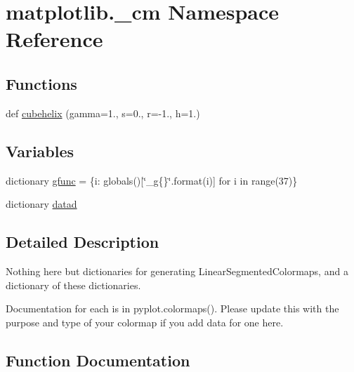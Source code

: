 \hypertarget{namespacematplotlib_1_1__cm}{}\section{matplotlib.\+\_\+cm Namespace Reference}
\label{namespacematplotlib_1_1__cm}
\subsection*{Functions}
\begin{DoxyCompactItemize}
\item 
def \hyperlink{namespacematplotlib_1_1__cm_a236bd259bdb245a1c9721b07f202d4cc}{cubehelix} (gamma=1., s=0., r=-\/1., h=1.)
\end{DoxyCompactItemize}
\subsection*{Variables}
\begin{DoxyCompactItemize}
\item 
dictionary \hyperlink{namespacematplotlib_1_1__cm_a9bbe2a8386ea32ab4b30d46bcbf0d7d1}{gfunc} = \{i\+: globals()\mbox{[}\char`\"{}\+\_\+g\{\}\char`\"{}.format(i)\mbox{]} for i in range(37)\}
\item 
dictionary \hyperlink{namespacematplotlib_1_1__cm_a850e39f17753e40e28a5b30d489dd44a}{datad}
\end{DoxyCompactItemize}


\subsection{Detailed Description}
\begin{DoxyVerb}Nothing here but dictionaries for generating LinearSegmentedColormaps,
and a dictionary of these dictionaries.

Documentation for each is in pyplot.colormaps().  Please update this
with the purpose and type of your colormap if you add data for one here.
\end{DoxyVerb}
 

\subsection{Function Documentation}
\mbox{\label{namespacematplotlib_1_1__cm_a236bd259bdb245a1c9721b07f202d4cc}} 
